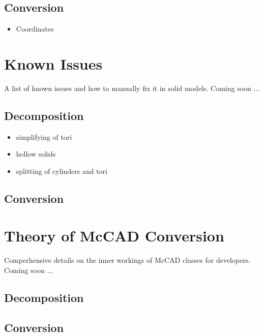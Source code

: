\documentclass[letterpaper, 10 pt]{report}
\begin{document}
\subsection{Conversion}
\begin{itemize}
	\item Coordinates
\end{itemize}


\section{Known Issues}
A list of known issues and how to manually fix it in solid models. Coming soon ...
\subsection{Decomposition}
\begin{itemize}
	\item simplifying of tori
	\item hollow solids
	\item splitting of cylinders and tori
\end{itemize}
\subsection{Conversion}


\section{Theory of McCAD Conversion}
Comperhensive details on the inner workings of McCAD classes for developers. Coming soon ...
\subsection{Decomposition}
\subsection{Conversion}
\newpage
%

\end{document}

